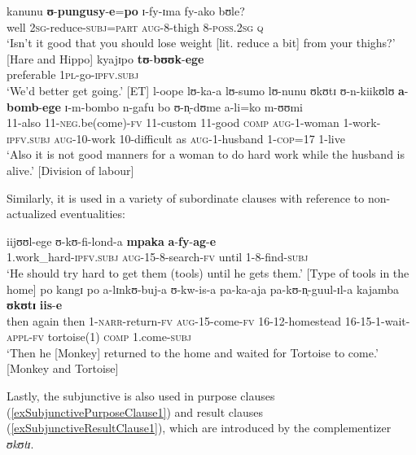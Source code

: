 \begin{exe}
\ex \label{exSubjunctiveSubNonActualized1} \gll kanunu \textbf{ʊ}-\textbf{pungusy}-\textbf{e}=\textbf{po} ɪ-fy-ɪma fy-ako bʊle?\\
well \textsc{2sg}-reduce-\textsc{subj}=\textsc{part} \textsc{aug}-8-thigh 8-\textsc{poss.2sg} \textsc{q}\\
\glt `Isn't it good that you should lose weight [lit. reduce a bit] from your thighs?' [Hare and Hippo]
\ex \label{exSubjunctiveSubNonActualized2} \gll kyajɪpo \textbf{tʊ}-\textbf{bʊʊk}-\textbf{ege}\\
preferable \textsc{1pl}-go-\textsc{ipfv.subj}\\
\glt \lq We'd better get going.' [ET]
\ex \label{exSubjunctivPotential}
\gll l-oope lʊ-ka-a lʊ-sumo lʊ-nunu ʊkʊtɪ ʊ-n-kiikʊlʊ \textbf{a}-\textbf{bomb}-\textbf{ege} ɪ-m-bombo n-gafu bo ʊ-n̩-dʊme a-li=ko m-ʊʊmi\\
11-also 11-\textsc{neg}.be(come)-\textsc{fv} 11-custom 11-good \textsc{comp} \textsc{aug}-1-woman 1-work-\textsc{ipfv.subj} \textsc{aug}-10-work 10-difficult as \textsc{aug}-1-husband 1-\textsc{cop}=17 1-live\\
\glt \lq ‎‎Also it is not good manners for a woman to do hard work while the husband is alive.' [Division of labour]
\end{exe}

Similarly, it is used in a variety of subordinate clauses with reference to non-actualized eventualities:
\begin{exe}
\ex \gll iijʊʊl-ege ʊ-kʊ-fi-lond-a \textbf{mpaka} \textbf{a}-\textbf{fy}-\textbf{ag}-\textbf{e}\\
1.work\_hard-\textsc{ipfv.subj} \textsc{aug}-15-8-search-\textsc{fv} until 1-8-find-\textsc{subj}\\
\glt \lq He should try hard to get them (tools) until he gets them.' [Type of tools in the home]
\ex \gll po kangɪ po a-lɪnkʊ-buj-a ʊ-kw-is-a pa-ka-aja pa-kʊ-n̩-guul-ɪl-a kajamba \textbf{ʊkʊtɪ} \textbf{iis}-\textbf{e}\\
then again then 1-\textsc{narr}-return-\textsc{fv} \textsc{aug}-15-come-\textsc{fv} 16-12-homestead 16-15-1-wait-\textsc{appl}-\textsc{fv} tortoise(1) \textsc{comp} 1.come-\textsc{subj}\\
\glt `‎‎Then he [Monkey] returned to the home and waited for Tortoise to come.' [Monkey and Tortoise]
\end{exe}

Lastly, the subjunctive is also used in purpose clauses (\ref{exSubjunctivePurposeClause1}) and result clauses (\ref{exSubjunctiveResultClause1}), which are introduced by the complementizer \textit{ʊkʊtɪ}.

